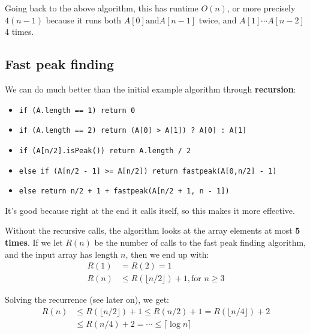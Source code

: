 \documentclass[11pt,a4paper,titlepage,dvipsnames,cmyk]{scrartcl}
\begin{document}
Going back to the above algorithm, this has runtime $O(n)$, or more
precisely $4(n-1)$ because it runs both $A[0] \text{and} A[n-1]$ twice,
and $A[1] \cdots A[n-2]$ 4 times.

\subsection{Fast peak finding}%
\label{sub:fast-peak}
We can do much better than the initial example algorithm through
\textbf{recursion}:
\begin{itemize}
    \item \lstinline|if (A.length == 1) return 0|
    \item \lstinline|if (A.length == 2) return (A[0] > A[1]) ? A[0] : A[1]|
    \item \lstinline|if (A[n/2].isPeak()) return A.length / 2|
    \item \lstinline|else if (A[n/2 - 1] >= A[n/2]) return fastpeak(A[0,n/2] - 1)|
    \item \lstinline|else return n/2 + 1 + fastpeak(A[n/2 + 1, n - 1])| 
\end{itemize}

It's good because right at the end it calls itself, so this makes it more
effective.

Without the recursive calls, the algorithm looks at the array elements at
most \textbf{5 times}. If we let $R(n)$ be the number of calls to the fast
peak finding algorithm, and the input array has length $n$, then we end up
with:
\begin{align*}
    R(1) &= R(2) = 1 \\
    R(n) &\le R(\lfloor n/2 \rfloor) + 1, \text{for } n \ge 3
\end{align*}

Solving the recurrence (see later on), we get:
\begin{align*}
    R(n) &\le R(\lfloor n/2 \rfloor) + 1 \le R(n/2) + 1 = R(\lfloor n/4
    \rfloor) + 2 \\
         &\le R(n/4) + 2 = \cdots \le \lceil \log n \rceil
\end{align*}
\end{document}
